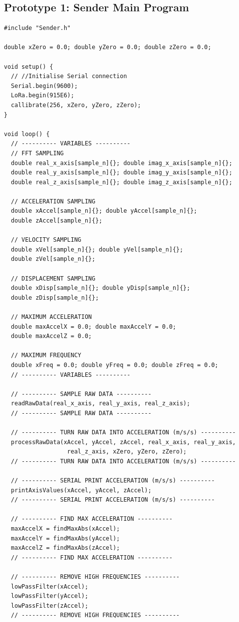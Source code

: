 \subsection{Prototype 1: Sender Main Program}
\begin{verbatim}
#include "Sender.h"

double xZero = 0.0; double yZero = 0.0; double zZero = 0.0;

void setup() {
  // //Initialise Serial connection
  Serial.begin(9600);
  LoRa.begin(915E6);
  callibrate(256, xZero, yZero, zZero);
}

void loop() {
  // ---------- VARIABLES ----------
  // FFT SAMPLING
  double real_x_axis[sample_n]{}; double imag_x_axis[sample_n]{};
  double real_y_axis[sample_n]{}; double imag_y_axis[sample_n]{};
  double real_z_axis[sample_n]{}; double imag_z_axis[sample_n]{};
  
  // ACCELERATION SAMPLING
  double xAccel[sample_n]{}; double yAccel[sample_n]{}; 
  double zAccel[sample_n]{};

  // VELOCITY SAMPLING
  double xVel[sample_n]{}; double yVel[sample_n]{}; 
  double zVel[sample_n]{};

  // DISPLACEMENT SAMPLING
  double xDisp[sample_n]{}; double yDisp[sample_n]{}; 
  double zDisp[sample_n]{};

  // MAXIMUM ACCELERATION
  double maxAccelX = 0.0; double maxAccelY = 0.0; 
  double maxAccelZ = 0.0;

  // MAXIMUM FREQUENCY
  double xFreq = 0.0; double yFreq = 0.0; double zFreq = 0.0;
  // ---------- VARIABLES ----------

  // ---------- SAMPLE RAW DATA ----------
  readRawData(real_x_axis, real_y_axis, real_z_axis);
  // ---------- SAMPLE RAW DATA ----------
  
  // ---------- TURN RAW DATA INTO ACCELERATION (m/s/s) ----------
  processRawData(xAccel, yAccel, zAccel, real_x_axis, real_y_axis, 
                  real_z_axis, xZero, yZero, zZero);
  // ---------- TURN RAW DATA INTO ACCELERATION (m/s/s) ----------
  
  // ---------- SERIAL PRINT ACCELERATION (m/s/s) ----------
  printAxisValues(xAccel, yAccel, zAccel);
  // ---------- SERIAL PRINT ACCELERATION (m/s/s) ----------

  // ---------- FIND MAX ACCELERATION ----------
  maxAccelX = findMaxAbs(xAccel);
  maxAccelY = findMaxAbs(yAccel);
  maxAccelZ = findMaxAbs(zAccel);
  // ---------- FIND MAX ACCELERATION ----------

  // ---------- REMOVE HIGH FREQUENCIES ----------
  lowPassFilter(xAccel);
  lowPassFilter(yAccel);
  lowPassFilter(zAccel);
  // ---------- REMOVE HIGH FREQUENCIES ----------


\end{verbatim}

